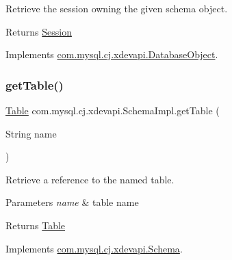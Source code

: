 Retrieve the session owning the given schema object.

\begin{DoxyReturn}{Returns}
\mbox{\hyperlink{interfacecom_1_1mysql_1_1cj_1_1xdevapi_1_1_session}{Session}} 
\end{DoxyReturn}


Implements \mbox{\hyperlink{interfacecom_1_1mysql_1_1cj_1_1xdevapi_1_1_database_object_a0bebc7132108a9cfcffed4a599b2dad5}{com.\+mysql.\+cj.\+xdevapi.\+Database\+Object}}.

\mbox{\label{classcom_1_1mysql_1_1cj_1_1xdevapi_1_1_schema_impl_a47c591b1796cbcb04985088ad3cbaad7}} 
\subsubsection{\texorpdfstring{get\+Table()}{getTable()}\hspace{0.1cm}{\footnotesize\ttfamily [1/2]}}
{\footnotesize\ttfamily \mbox{\hyperlink{interfacecom_1_1mysql_1_1cj_1_1xdevapi_1_1_table}{Table}} com.\+mysql.\+cj.\+xdevapi.\+Schema\+Impl.\+get\+Table (\begin{DoxyParamCaption}\item[{String}]{name }\end{DoxyParamCaption})}

Retrieve a reference to the named table.


\begin{DoxyParams}{Parameters}
{\em name} & table name \\
\hline
\end{DoxyParams}
\begin{DoxyReturn}{Returns}
\mbox{\hyperlink{interfacecom_1_1mysql_1_1cj_1_1xdevapi_1_1_table}{Table}} 
\end{DoxyReturn}


Implements \mbox{\hyperlink{interfacecom_1_1mysql_1_1cj_1_1xdevapi_1_1_schema_a27cf7ad5981483a0e44b6ea795b3e428}{com.\+mysql.\+cj.\+xdevapi.\+Schema}}.

\mbox{\label{classcom_1_1mysql_1_1cj_1_1xdevapi_1_1_schema_impl_a6bef049505f3d49b68e56fb2169dc165}} 
